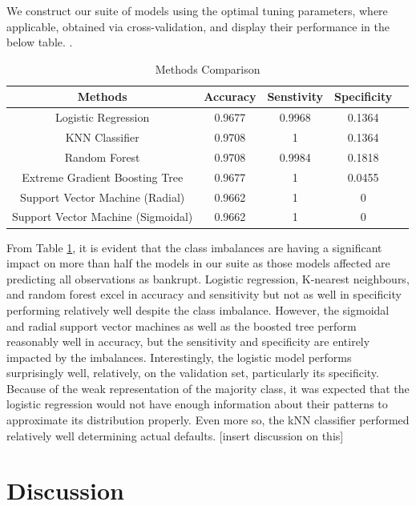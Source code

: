 \documentclass[12pt]{report}
\begin{document}
 We construct our suite of models using the optimal tuning parameters, where applicable, obtained via cross-validation, and display their performance in the below table. .

\begin{table}[ht]
\doublespacing
\centering
\caption{Methods Comparison}
\begin{tabular}{ccccc}
\label{modelcomp}
\textbf{Methods}          & \textbf{Accuracy} & \textbf{Senstivity} & \textbf{Specificity} \\ \hline
Logistic Regression       & 0.9677                  & 0.9968              & 0.1364              \\
KNN Classifier            & 0.9708                & 1             & 0.1364             \\
Random Forest             & 0.9708                  & 0.9984              & 0.1818              \\
Extreme Gradient Boosting Tree & 0.9677           & 1              & 0.0455\\
Support Vector Machine (Radial) & 0.9662           & 1              & 0             \\  
Support Vector Machine (Sigmoidal) & 0.9662           & 1             & 0
\end{tabular}

\end{table}

From Table \ref{modelcomp}, it is evident that the class imbalances are having a significant impact on more than half the models in our suite as those models affected are predicting all observations as bankrupt. Logistic regression, K-nearest neighbours, and random forest excel in accuracy and sensitivity but not as well in specificity performing relatively well despite the class imbalance. However, the sigmoidal and radial support vector machines as well as the boosted tree perform reasonably well in accuracy, but the sensitivity and specificity are entirely impacted by the imbalances. Interestingly, the logistic model performs surprisingly well, relatively, on the validation set, particularly its specificity. Because of the weak representation of the majority class, it was expected that the logistic regression would not have enough information about their patterns to approximate its distribution properly. Even more so, the kNN classifier performed relatively well determining actual defaults. [insert discussion on this]

\section{Discussion}
\end{document}
